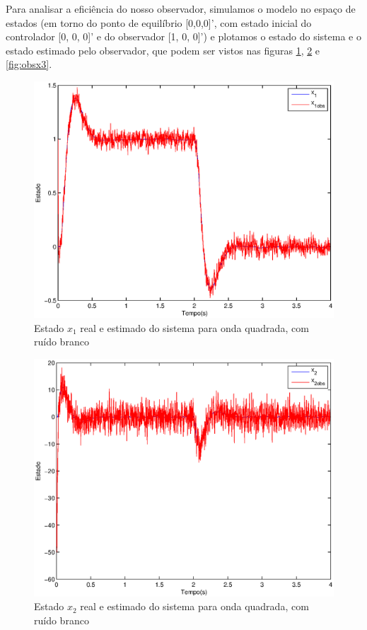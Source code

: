 \documentclass{article}
\begin{document}
Para analisar a eficiência do nosso observador, simulamos o modelo no espaço de estados (em torno do ponto de equilíbrio [0,0,0]', com estado inicial do controlador [0, 0, 0]' e do observador [1, 0, 0]') e plotamos o estado do sistema e o estado estimado pelo observador, que podem ser vistos nas figuras \ref{fig:obsx1}, \ref{fig:obsx2} e \ref{fig:obsx3}.
\begin{figure}[H]
	\centering
	\includegraphics[width=0.8\linewidth]{../obsx1}
	\caption{Estado $x_1$ real e estimado do sistema para onda quadrada, com ruído branco}
	\label{fig:obsx1}
\end{figure}
\begin{figure}[H]
	\centering
	\includegraphics[width=0.8\linewidth]{../obsx2}
	\caption{Estado $x_2$ real e estimado do sistema para onda quadrada, com ruído branco}
	\label{fig:obsx2}
\end{figure}
\end{document}
